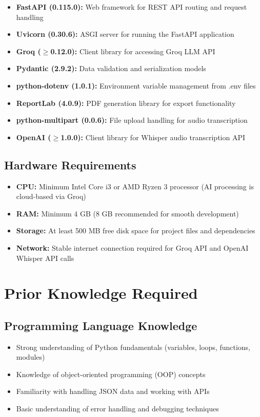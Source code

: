 \documentclass[12pt,a4paper]{article}
\begin{document}
\begin{itemize}
  \item \textbf{FastAPI (0.115.0):} Web framework for REST API routing and request handling
  \item \textbf{Uvicorn (0.30.6):} ASGI server for running the FastAPI application
  \item \textbf{Groq ($\geq$0.12.0):} Client library for accessing Groq LLM API
  \item \textbf{Pydantic (2.9.2):} Data validation and serialization models
  \item \textbf{python-dotenv (1.0.1):} Environment variable management from .env files
  \item \textbf{ReportLab (4.0.9):} PDF generation library for export functionality
  \item \textbf{python-multipart (0.0.6):} File upload handling for audio transcription
  \item \textbf{OpenAI ($\geq$1.0.0):} Client library for Whisper audio transcription API
\end{itemize}

\subsection{Hardware Requirements}
\begin{itemize}
  \item \textbf{CPU:} Minimum Intel Core i3 or AMD Ryzen 3 processor (AI processing is cloud-based via Groq)
  \item \textbf{RAM:} Minimum 4 GB (8 GB recommended for smooth development)
  \item \textbf{Storage:} At least 500 MB free disk space for project files and dependencies
  \item \textbf{Network:} Stable internet connection required for Groq API and OpenAI Whisper API calls
\end{itemize}


\section{Prior Knowledge Required}

\subsection{Programming Language Knowledge}
\begin{itemize}
  \item Strong understanding of Python fundamentals (variables, loops, functions, modules)
  \item Knowledge of object-oriented programming (OOP) concepts
  \item Familiarity with handling JSON data and working with APIs
  \item Basic understanding of error handling and debugging techniques
\end{itemize}
\end{document}
